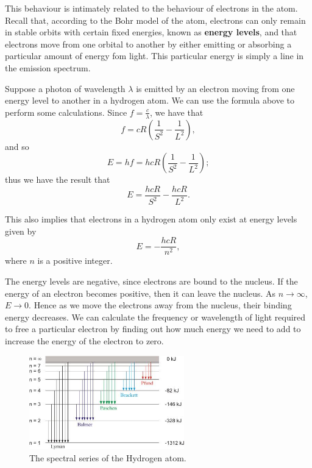 \documentclass[a4paper]{amsbook}
\newcommand{\marginsymbol}{}
\theoremstyle{definition}
\numberwithin{exercise}{chapter}
\numberwithin{exercise}{chapter}
\begin{document}
This behaviour is intimately related to the behaviour of electrons in the atom. Recall that, according to the
Bohr model of the atom, electrons can only remain in stable orbits with certain fixed energies, known as \textbf{energy levels},
and that electrons move from one orbital to another by either emitting or absorbing a particular amount of energy fom light.
This particular energy is simply a line in the emission spectrum.

Suppose a photon of wavelength $ \lambda $ is emitted by an electron moving from one energy level to another in a hydrogen
atom. We can use the formula above to perform some calculations. Since $ f = \frac{c}{\lambda} $, we have that
\begin{displaymath}
  f = cR \left( \frac{1}{S^2} - \frac{1}{L^2} \right),
\end{displaymath}
and so
\begin{displaymath}
  E = hf = hcR \left( \frac{1}{S^2} - \frac{1}{L^2} \right);
\end{displaymath}
thus we have the result that
\begin{equation}
  E = \frac{hcR}{S^2} - \frac{hcR}{L^2}.
\end{equation}

\marginsymbol This also implies that electrons in a hydrogen atom only exist at energy levels given by
\begin{equation}
  E = -\frac{hcR}{n^2},
\end{equation}
where $ n $ is a positive integer.

The energy levels are negative, since electrons are bound to the nucleus. If the energy of an electron becomes positive,
then it can leave the nucleus. As $ n \to\infty $, $ E \to 0 $. Hence as we move the electrons away from the nucleus, their
binding energy decreases. We can calculate the frequency or wavelength of light required to free a particular electron by finding
out how much energy we need to add to increase the energy of the electron to zero.

\begin{figure}
  \centering
  \includegraphics[width=0.6\textwidth]{hydrogen2}
  \caption{The spectral series of the Hydrogen atom. \label{fig:hydrogen2}}
\end{figure}
\end{document}

